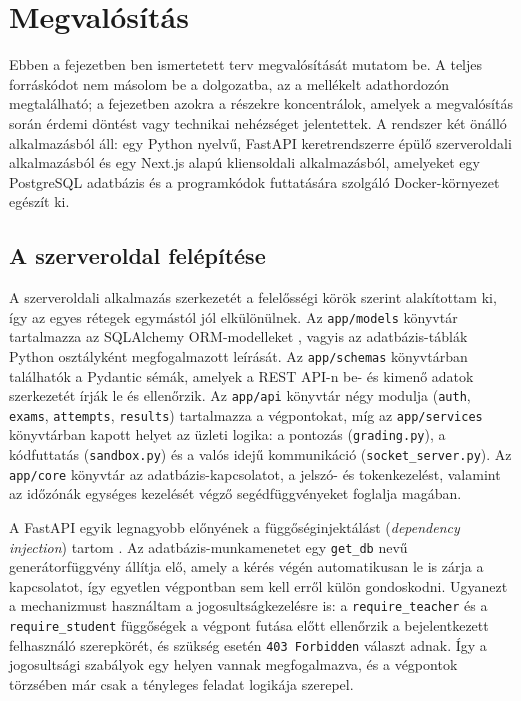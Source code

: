 \chapter{Megvalósítás}
\label{ch:megvalositas}

Ebben a fejezetben ben ismertetett terv megvalósítását mutatom be.
A teljes forráskódot nem másolom be a dolgozatba, az a mellékelt adathordozón megtalálható;
a fejezetben azokra a részekre koncentrálok, amelyek a megvalósítás során érdemi döntést
vagy technikai nehézséget jelentettek. A rendszer két önálló alkalmazásból áll: egy Python
nyelvű, FastAPI keretrendszerre épülő szerveroldali alkalmazásból és egy Next.js alapú
kliensoldali alkalmazásból, amelyeket egy PostgreSQL adatbázis és a programkódok futtatására
szolgáló Docker-környezet egészít ki.

\section{A szerveroldal felépítése}

A szerveroldali alkalmazás szerkezetét a felelősségi körök szerint alakítottam ki, így az
egyes rétegek egymástól jól elkülönülnek. Az \texttt{app/models} könyvtár tartalmazza az
SQLAlchemy ORM-modelleket \cite{sqlalchemy_docs}, vagyis az adatbázis-táblák Python
osztályként megfogalmazott leírását. Az \texttt{app/schemas} könyvtárban találhatók a Pydantic
sémák, amelyek a REST API-n be- és kimenő adatok szerkezetét írják le és ellenőrzik. Az
\texttt{app/api} könyvtár négy modulja (\texttt{auth}, \texttt{exams}, \texttt{attempts},
\texttt{results}) tartalmazza a végpontokat, míg az \texttt{app/services} könyvtárban kapott
helyet az üzleti logika: a pontozás (\texttt{grading.py}), a kódfuttatás (\texttt{sandbox.py})
és a valós idejű kommunikáció (\texttt{socket\_server.py}). Az \texttt{app/core} könyvtár az
adatbázis-kapcsolatot, a jelszó- és tokenkezelést, valamint az időzónák egységes kezelését
végző segédfüggvényeket foglalja magában.

A FastAPI egyik legnagyobb előnyének a függőséginjektálást (\textit{dependency injection})
tartom \cite{fastapi_docs}. Az adatbázis-munkamenetet egy \texttt{get\_db} nevű generátorfüggvény
állítja elő, amely a kérés végén automatikusan le is zárja a kapcsolatot, így egyetlen
végpontban sem kell erről külön gondoskodni. Ugyanezt a mechanizmust használtam a
jogosultságkezelésre is: a \texttt{require\_teacher} és a \texttt{require\_student} függőségek
a végpont futása előtt ellenőrzik a bejelentkezett felhasználó szerepkörét, és szükség esetén
\texttt{403 Forbidden} választ adnak. Így a jogosultsági szabályok egy helyen vannak megfogalmazva,
és a végpontok törzsében már csak a tényleges feladat logikája szerepel.

